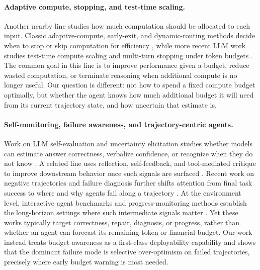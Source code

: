 \paragraph{Adaptive compute, stopping, and test-time scaling.}
Another nearby line studies how much computation should be allocated to each input. Classic adaptive-compute, early-exit, and dynamic-routing methods decide when to stop or skip computation for efficiency \cite{graves2016adaptive,teerapittayanon2016branchynet,wang2018skipnet,kaya2019shallowdeep,chen2020learningtostop,zeng2023learningtoskip}, while more recent LLM work studies test-time compute scaling and multi-turn stopping under token budgets \cite{zhou2026adaptive,snell2025scaling,muennighoff2025s1}. The common goal in this line is to improve performance given a budget, reduce wasted computation, or terminate reasoning when additional compute is no longer useful. Our question is different: not how to spend a fixed compute budget optimally, but whether the agent knows how much additional budget it will need from its current trajectory state, and how uncertain that estimate is.

\paragraph{Self-monitoring, failure awareness, and trajectory-centric agents.}
Work on LLM self-evaluation and uncertainty elicitation studies whether models can estimate answer correctness, verbalize confidence, or recognize when they do not know \cite{kadavath2022language,xiong2024can,kapoor2024large,yona2024can,deng2024towards,manakul2023selfcheckgpt}. A related line uses reflection, self-feedback, and tool-mediated critique to improve downstream behavior once such signals are surfaced \cite{madaan2023selfrefine,shinn2023reflexion,gou2024critic,liu2024intrinsicselfcorrection,hu2024uncertainty,wang2024devils}. Recent work on negative trajectories and failure diagnosis further shifts attention from final task success to where and why agents fail along a trajectory \cite{wang2024learningfromfailure,barke2026agentrx}. At the environment level, interactive agent benchmarks and progress-monitoring methods establish the long-horizon settings where such intermediate signals matter \cite{yao2023react,yao2022webshop,zhou2023webarena,liu2024agentbench,shridhar2021alfworld,ma2019selfmonitoring,ma2019theregretful}. Yet these works typically target correctness, repair, diagnosis, or progress, rather than whether an agent can forecast its remaining token or financial budget. Our work instead treats budget awareness as a first-class deployability capability and shows that the dominant failure mode is selective over-optimism on failed trajectories, precisely where early budget warning is most needed.


